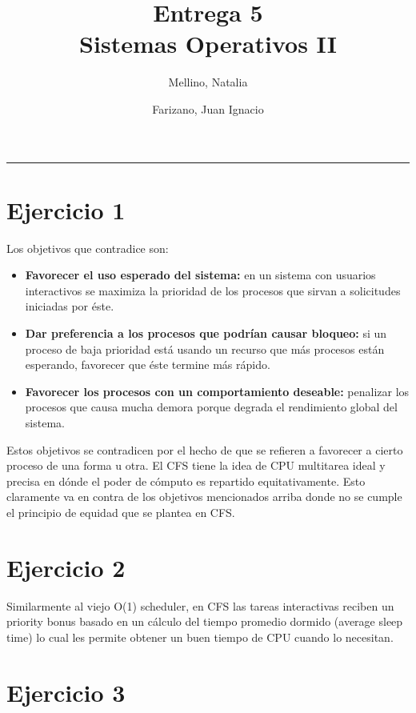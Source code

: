 \documentclass[11pt]{article}
\title{
    Entrega 5 \\
    \large Sistemas Operativos II}
\author{Mellino, Natalia \and Farizano, Juan Ignacio}
\date{}
\begin{document}
\maketitle

\noindent\rule{\textwidth}{1pt}

\section*{Ejercicio 1}

Los objetivos que contradice son:

\begin{itemize} 
    \item \textbf{Favorecer el uso esperado del sistema:} en un sistema con usuarios interactivos
          se maximiza la prioridad de los procesos que sirvan a solicitudes iniciadas por éste.

    \item \textbf{Dar preferencia a los procesos que podrían causar bloqueo:} si un proceso de 
          baja prioridad está usando un recurso que más procesos están esperando, favorecer
          que éste termine más rápido.

    \item \textbf{Favorecer los procesos con un comportamiento deseable:} penalizar los procesos
          que causa mucha demora porque degrada el rendimiento global del sistema.
\end{itemize}

Estos objetivos se contradicen por el hecho de que se refieren a favorecer a cierto
proceso de una forma u otra. El CFS tiene la idea de CPU multitarea ideal y 
precisa en dónde el poder de cómputo es repartido equitativamente. Esto
claramente va en contra de los objetivos mencionados arriba donde no se cumple
el principio de equidad que se plantea en CFS.

\section*{Ejercicio 2}

Similarmente al viejo O(1) scheduler, en CFS las tareas interactivas reciben un
priority bonus basado en un cálculo del tiempo promedio dormido (average sleep
time) lo cual les permite obtener un buen tiempo de CPU cuando lo necesitan.


\section*{Ejercicio 3}
\end{document}
